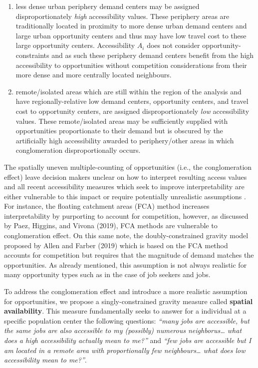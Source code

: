 \documentclass[]{elsarticle} %
\begin{document}
\begin{enumerate}
\def\labelenumi{\arabic{enumi})}
\item
  less dense urban periphery demand centers may be assigned
  disproportionately \emph{high} accessibility values. These periphery
  areas are traditionally located in proximity to more dense urban
  demand centers and large urban opportunity centers and thus may have
  low travel cost to these large opportunity centers. Accessibility
  \(A_i\) does not consider opportunity-constraints and as such these
  periphery demand centers benefit from the high accessibility to
  opportunities without competition considerations from their more dense
  and more centrally located neighbours.
\item
  remote/isolated areas which are still within the region of the
  analysis and have regionally-relative low demand centers, opportunity
  centers, and travel cost to opportunity centers, are assigned
  disproportionately \emph{low} accessibility values. These
  remote/isolated areas may be sufficiently supplied with opportunities
  proportionate to their demand but is obscured by the artificially high
  accessibility awarded to periphery/other areas in which conglomeration
  disproportionally occurs.
\end{enumerate}

The spatially uneven multiple-counting of opportunities (i.e., the
conglomeration effect) leave decision makers unclear on how to interpret
resulting access values and all recent accessibility measures which seek
to improve interpretability are either vulnerable to this impact or
require potentially unrealistic assumptions . For instance, the floating
catchment areas (FCA) method increases interpretability by purporting to
account for competition, however, as discussed by Paez, Higgins, and
Vivona (2019), FCA methods are vulnerable to conglomeration effect. On
this same note, the doubly-constrained gravity model proposed by Allen
and Farber (2019) which is based on the FCA method accounts for
competition but requires that the magnitude of demand matches the
opportunities. As already mentioned, this assumption is not always
realistic for many opportunity types such as in the case of job seekers
and jobs.

To address the conglomeration effect and introduce a more realistic
assumption for opportunities, we propose a singly-constrained gravity
measure called \textbf{spatial availability}. This measure fundamentally
seeks to answer for a individual at a specific population center the
following questions: \emph{``many jobs are accessible, but the same jobs
are also accessible to my (possibly) numerous neighborus\ldots{} what
does a high accessibility actually mean to me?''} and \emph{``few jobs
are accessible but I am located in a remote area with proportionally few
neighbours\ldots{} what does low accessibility mean to me?''}.
\end{document}
